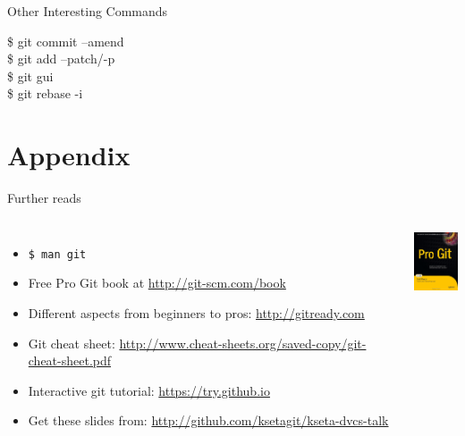 \documentclass[18pt,mathserif]{beamer}
\newenvironment{shell}[1][\linewidth]
  {\begin{mdframed}[
  skipabove=\topsep,
  skipbelow=\topsep,
  font=\ttfamily,
  linecolor=black!9,
  backgroundcolor=black!9,
  innertopmargin=6pt,
  innerbottommargin=6pt,
  innerleftmargin=6pt,
  innerrightmargin=6pt,
  userdefinedwidth=#1]}
  {\end{mdframed}}
\begin{document}
\begin{frame}{Other Interesting Commands}
    \begin{shell}
      \$ git commit --amend \\
			\$ git add --patch/-p \\
			\$ git gui \\
			\$ git rebase -i \\
    \end{shell}
\end{frame}



\section{Appendix}

\begin{frame}{Further reads}
  \begin{columns}[T,onlytextwidth]
      \begin{itemize}
        \item \texttt{\$ man git} %
        \item Free Pro Git book at \url{http://git-scm.com/book}
        \item Different aspects from beginners to pros: \url{http://gitready.com}
        \item Git cheat sheet: \url{http://www.cheat-sheets.org/saved-copy/git-cheat-sheet.pdf}
				\item Interactive git tutorial: \url{https://try.github.io}
				\item Get these slides from: \url{http://github.com/ksetagit/kseta-dvcs-talk}\\
      \end{itemize}
      \centering
      \includegraphics[width=1.5cm]{images/pro-git}
  \end{columns}
\end{frame}
\end{document}
